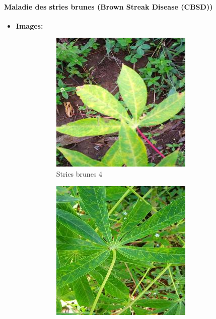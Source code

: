 \paragraph{Maladie des stries brunes (Brown Streak Disease (CBSD))}
\begin{itemize}
	\item \textbf{Images: }
	\begin{figure}[htbp]
		\centering
		\begin{subfigure}[b]{0.3\textwidth}
			\centering
			\includegraphics[width=\textwidth]{images/4.jpg}
			\caption{Stries brunes 4}
		\end{subfigure}
		\hfill
		\begin{subfigure}[b]{0.3\textwidth}
			\centering
			\includegraphics[width=\textwidth]{images/5.jpg}

\end{subfigure}
\end{figure}
\end{itemize}

